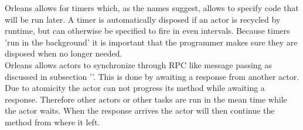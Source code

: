 Orleans allows for timers which, as the names suggest, allows to specify code that will be run later. A timer is automatically disposed if an actor is recycled by runtime, but can otherwise be specified to fire in even intervals. Because timers 'run in the background' it is important that the programmer makes sure they are disposed when no longer needed.\\
Orleans allows actors to synchronize through RPC like message passing as discussed in subsection ''. This is done by awaiting a response from another actor. Due to atomicity the actor can not progress its method while awaiting a response. Therefore other actors or other tasks are run in the mean time while the actor waits. When the response arrives the actor will then continue the method from where it left.